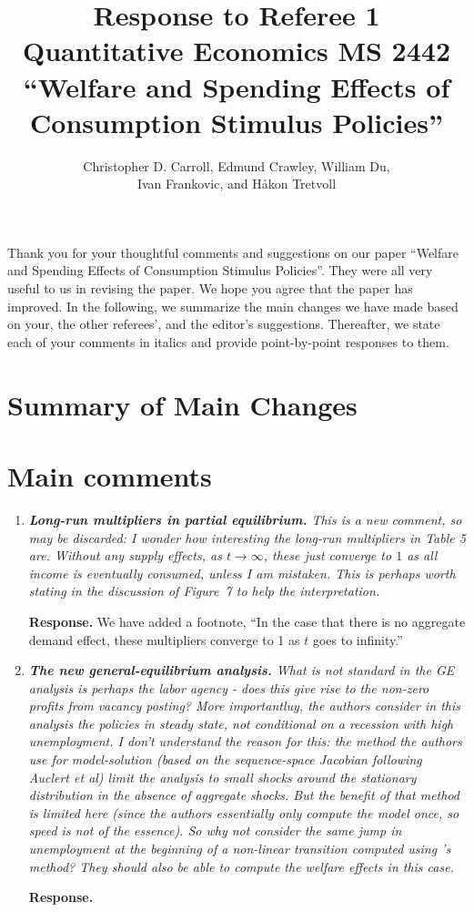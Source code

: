 \documentclass[12pt,letterpaper,english]{article}
\title{\textbf{Response to Referee 1\\ Quantitative Economics MS 2442 \\``Welfare and Spending Effects of \\ Consumption Stimulus Policies''}}
\author{Christopher D. Carroll, Edmund Crawley, William Du, \\ Ivan Frankovic, and H\aa kon Tretvoll}
\date{}
\begin{document}
	\onehalfspacing
	\maketitle
	
\noindent Thank you for your thoughtful comments and suggestions on our paper ``Welfare and Spending Effects of Consumption Stimulus Policies''. They were all very useful to us in revising the paper. We hope you agree that the paper has improved. In the following, we summarize the main changes we have made based on your, the other referees', and the editor's suggestions. Thereafter, we state each of your comments in italics and provide point-by-point responses to them.

\section{Summary of Main Changes}



\newpage 

\section*{Main comments}
\begin{enumerate}[label=(\alph*)]
	\item \textit{\textbf{Long-run multipliers in partial equilibrium.} This is a new comment, so
		may be discarded: I wonder how interesting the long-run multipliers	in Table 5 are. Without any supply effects, as $t \rightarrow \infty$, these just converge to $1$ as all income is eventually consumed, unless I am mistaken. This is perhaps worth stating in the discussion of Figure~7 to help the interpretation.}
	
	\noindent \textbf{Response.}  We have added a footnote, ``In the case that there is no aggregate demand effect, these multipliers converge to 1 as $t$ goes to infinity.''
	
	\item \textit{\textbf{The new general-equilibrium analysis.} What is not standard in the GE analysis is perhaps the labor agency - does this give rise to the non-zero profits from vacancy posting? More importantluy, the authors consider in this analysis the policies in steady state, not conditional	on a recession with high unemployment. I don't understand the reason for this: the method the authors use for model-solution (based on the sequence-space Jacobian following Auclert et al) limit the analysis to small shocks around the stationary distribution in the absence of aggregate shocks. But the benefit of that method is	limited here (since the authors essentially only compute the model once, so speed is not of the essence). So why not consider the same jump in unemployment at the beginning of a non-linear transition computed using \citet{boppart2018exploiting}'s method? They should also be able to compute the welfare effects in this case.}
	
	\noindent \textbf{Response.} 
\end{enumerate}
\end{document}
